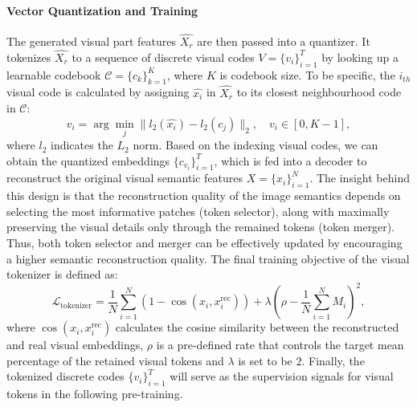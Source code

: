 \paragraph{Vector Quantization and Training} The generated visual part features $\hat{X_r}$ are then passed into a quantizer. It tokenizes $\hat{X_r}$ to a sequence of discrete visual codes $V=\{v_i\}_{i=1}^T$ by looking up a learnable codebook $\mathcal{C}=\{c_k\}_{k=1}^{K}$, where $K$ is codebook size. To be specific, the $i_{th}$ visual code is calculated by assigning $\hat{x_i}$ in $\hat{X_r}$ to its closest neighbourhood code in $\mathcal{C}$: 
\begin{equation}
    v_i = \arg \min_{j} \| l_{2}(\hat{x_i}) - l_{2}(c_j)\|_2, \quad v_i \in [0, K-1],
\end{equation}
where $l_2$ indicates the $L_2$ norm. Based on the indexing visual codes, we can obtain the quantized embeddings $\{c_{v_i}\}_{i=1}^T$, which is fed into a decoder to reconstruct the original visual semantic features $X=\{x_i\}_{i=1}^{N}$. The insight behind this design is that the reconstruction quality of the image semantics depends on selecting the most informative patches (token selector), along with maximally preserving the visual details only through the remained tokens (token merger). Thus, both token selector and merger can be effectively updated by encouraging a higher semantic reconstruction quality. The final training objective of the visual tokenizer is defined as:
\begin{equation}
    \mathcal{L}_{\text{tokenizer}} = \frac{1}{N} \sum_{i=1}^{N} \left( 1 - \cos (x_i, x_i^{\text{rec}}) \right)+ \lambda (\rho - \frac{1}{N} \sum_{i=1}^{N} M_i)^2,
\end{equation}
where $\cos (x_i, x_i^{\text{rec}})$ calculates the cosine similarity between the reconstructed and real visual embeddings, $\rho$ is a pre-defined rate that controls the target mean percentage of the retained visual tokens and $\lambda$ is set to be $2$. Finally, the tokenized discrete codes $\{v_i\}_{i=1}^T$ will serve as the supervision signals for visual tokens in the following pre-training.

\vspace{-0.1in}


